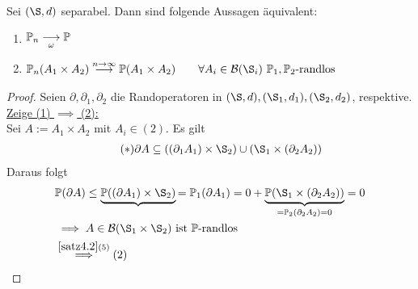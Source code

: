 \begin{theorem}\label{theorem4.19}
Sei $(\S,d)$ separabel. Dann sind folgende Aussagen äquivalent:
\begin{enumerate}[label=(\arabic*)]
\item $\begin{aligned}
\mathbb{P}_n\underset{\omega}{\overset{}{\longrightarrow}} \mathbb{P} 
\end{aligned}$
\item $\begin{aligned}
\P_n(A_1\times A_2)\stackrel{n\to\infty}{\longrightarrow} \P(A_1\times A_2)\qquad\forall A_i\in\B(\S_i)~\P_1,\P_2\text{-randlos}
\end{aligned}$
\end{enumerate}
\end{theorem}
\begin{proof}
Seien $\partial,\partial_1,\partial_2$ die Randoperatoren in $(\S,d),(\S_1,d_1),(\S_2,d_2)$, respektive.\\

\underline{Zeige (1) $\implies$ (2):}\\
Sei $A:=A_1\times A_2$ mit $A_i\in(2)$. Es gilt
\begin{align}\label{eqProof4.19Stern}\tag{$\ast$}
\partial A\subseteq((\partial_1 A_1)\times\S_2)\cup(\S_1\times(\partial_2 A_2))
\end{align}
Daraus folgt
\begin{align*}
&\P(\partial A)\leq \underbrace{\P((\partial A_1)\times\S_2)}{=\P_1(\partial A_1)=0}+\underbrace{\P(\S_1\times(\partial_2 A_2))}_ {=\P_2(\partial_2 A_2)=0}=0\\
&\implies
A\in\B(\S_1\times\S_2)\text{ ist $\P$-randlos}\\
&\stackrel{\ref{satz4.2}(5)}{\implies}(2)
\end{align*}


\end{proof}
